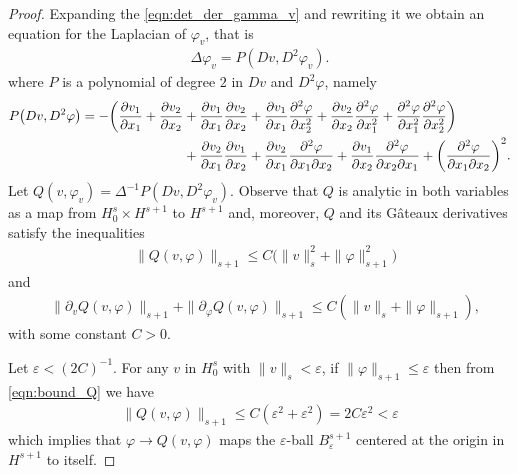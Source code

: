 \documentclass[11pt]{amsart}
\numberwithin{equation}{section}
\begin{document}
\begin{proof}
      Expanding the \eqref{eqn:det_der_gamma_v} and rewriting it we obtain an equation for the Laplacian of $\varphi_v$, that is
      \begin{align}\label{eqn:contraction_map}
      	\Delta\varphi_{v}= P(D v,D^2\varphi_{v}).
      \end{align}
  where $P$ is a polynomial of degree $2$ in $Dv$ and $D^2\varphi$, namely 
 \begin{align}
    P\big(D v,D^2\varphi\big)= -\bigg(\frac{\partial v_1}{\partial x_1}+ \frac{\partial v_2}{\partial x_2}
     &+ \frac{\partial v_1}{\partial x_1} \frac{\partial v_2}{\partial x_2}+ \frac{\partial v_1}{\partial x_1} \frac{\partial^2 \varphi}{\partial x_2^2}+ \frac{\partial v_2}{\partial x_2} \frac{\partial^2 \varphi}{\partial x_1^2} + \frac{\partial^2\varphi}{\partial x_1^2}\frac{\partial^2\varphi}{\partial x_2^2} \bigg)\notag\\
     &+  \frac{\partial v_2}{\partial x_1} \frac{\partial v_1}{\partial x_2}  + \frac{\partial v_2}{\partial x_1}  \frac{\partial^2 \varphi}{\partial x_1 \partial x_2}+ \frac{\partial v_1}{\partial x_2} \frac{\partial^2 \varphi}{\partial x_2 \partial x_1} + \bigg(\frac{\partial^2 \varphi}{\partial x_1 \partial x_2}\bigg)^2.
 \end{align}
 Let $Q(v,\varphi_{v})=  	\Delta^{-1} P(D v,D^2\varphi_{v})$.
Observe that $Q$ is analytic in both variables as a map from $H_0^s\times H^{s+1}$ to $H^{s+1}$ and, moreover, $Q$ and its G\^ateaux derivatives satisfy the inequalities
\begin{align}\label{eqn:bound_Q}
    &\|Q(v,\varphi)\|_{s+1}\le C\big(\|v\|_s^2+\|\varphi\|_{s+1}^2\big) 
\end{align}
and
\begin{align}\label{eqn:bound_nabla_Q}
    &\|\partial_vQ(v,\varphi)\|_{s+1}+\|\partial_{\varphi} Q(v,\varphi)\|_{s+1}\le C(\|v\|_s+\|\varphi\|_{s+1}),
\end{align}
with some constant $C>0$. 

Let $\varepsilon<(2C)^{-1}$. For any $v$ in $H_0^s$ with $\|v\|_{s}<\varepsilon$, if $\|\varphi\|_{s+1}\le \varepsilon$  then from \eqref{eqn:bound_Q} we have 
 \begin{align}
    	\|Q(v,\varphi)\|_{s+1}\le C(\varepsilon^2+\varepsilon^2)=2C\varepsilon^2< \varepsilon
    \end{align}
which implies that $\varphi \rightarrow Q(v,\varphi)$ maps the $\varepsilon$-ball $B_{\varepsilon}^{s+1}$ centered at the origin in $H^{s+1}$ to itself. 
   

\end{proof}
\end{document}
